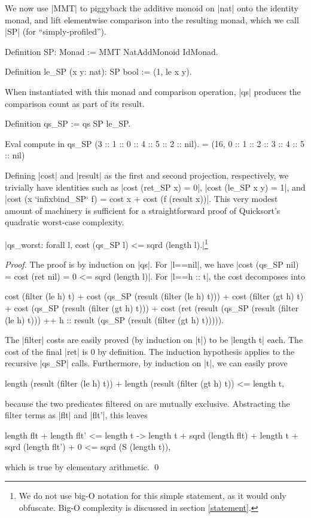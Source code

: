 \documentclass[runningheads]{llncs}
\begin{document}
We now use |MMT| to piggyback the additive monoid on |nat| onto the identity monad, and lift elementwise comparison into the resulting monad, which we call |SP| (for ``simply-profiled'').
\begin{code}
  Definition SP: Monad := MMT NatAddMonoid IdMonad.

  Definition le_SP (x y: nat): SP bool := (1, le x y).
\end{code}
When instantiated with this monad and comparison operation, |qs| produces the comparison count as part of its result.
\begin{code}
  Definition qs_SP := qs SP le_SP.

  Eval compute in qs_SP (3 :: 1 :: 0 :: 4 :: 5 :: 2 :: nil).
    = (16, 0 :: 1 :: 2 :: 3 :: 4 :: 5 :: nil)
\end{code}


Defining |cost| and |result| as the first and second projection, respectively, we trivially have identities such as |cost (ret_SP x) = 0|, |cost (le_SP x y) = 1|, and |cost (x `infixbind_SP` f) = cost x + cost (f (result x))|. This very modest amount of machinery is sufficient for a straightforward proof of Quicksort's quadratic worst-case complexity.

\begin{propo}|qs_worst: forall l, cost (qs_SP l) <= sqrd (length l).|\footnote{We do not use big-O notation for this simple statement, as it would only obfuscate. Big-O complexity is discussed in section \ref{statement}.}
\end{propo}

\begin{proof}
  The proof is by induction on |qs|. For |l==nil|, we have {|cost (qs_SP nil) = cost (ret nil) = 0 <= sqrd (length l)|}. For |l==h :: t|, the cost decomposes into
  \begin{code}
    cost (filter (le h) t) + cost (qs_SP (result (filter (le h) t))) +
    cost (filter (gt h) t) + cost (qs_SP (result (filter (gt h) t))) +
    cost (ret (result (qs_SP (result (filter (le h) t))) ++
     h :: result (qs_SP (result (filter (gt h) t))))).
  \end{code}
  The |filter| costs are easily proved (by induction on |t|) to be |length t| each. The cost of the final |ret| is 0 by definition. The induction hypothesis applies to the recursive |qs_SP| calls. Furthermore, by induction on |t|, we can easily prove
  \begin{code}
  length (result (filter (le h) t)) + length (result (filter (gt h) t)) <= length t,
  \end{code}
  because the two predicates filtered on are mutually exclusive. Abstracting the filter terms as |flt| and |flt'|, this leaves
  \begin{code}
    length flt + length flt' <= length t ->
      length t + sqrd (length flt) + length t + sqrd (length flt') + 0 <= sqrd (S (length t)),
  \end{code}
  which is true by elementary arithmetic. \qed
\end{proof}
\end{document}
